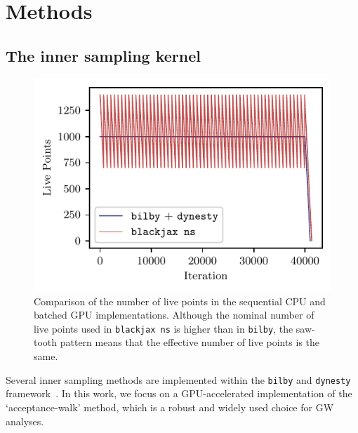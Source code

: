 \documentclass[fleqn,usenatbib]{mnras}
\begin{document}
\section{Methods}

\subsection{The inner sampling kernel}
\label{sec:methods_kernel}

\begin{figure}
    \centering
    \includegraphics{figures/nlive_comparison.pdf}
    \caption{Comparison of the number of live points in the sequential CPU and batched GPU implementations.
    Although the nominal number of live points used in \texttt{blackjax ns} is higher than in \texttt{bilby},
    the saw-tooth pattern means that the effective number of live points is the same.}
    \label{fig:nlive_comparison}
\end{figure}

Several inner sampling methods are implemented within the
\texttt{bilby} and \texttt{dynesty} framework~\citep{bilby_paper, dynesty}. In this work, we
focus on a GPU-accelerated implementation of the `acceptance-walk'
method, which is a robust and widely used choice for GW analyses.
\end{document}
